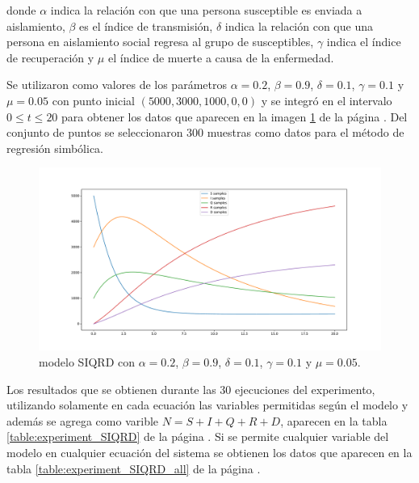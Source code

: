 donde $\alpha$ indica la relación con que una persona susceptible es enviada a aislamiento, $\beta$ es el índice de transmisión, $\delta$ indica la relación con que una persona en aislamiento social regresa al grupo de susceptibles, $\gamma$ indica el índice de recuperación y $\mu$ el índice de muerte a causa de la enfermedad.

Se utilizaron como valores de los parámetros $\alpha = 0.2$, $\beta = 0.9$, $\delta = 0.1$, $\gamma = 0.1$ y $\mu = 0.05$ con punto inicial $(5000, 3000, 1000, 0, 0)$ y se integró en el intervalo $0 \leq t \leq 20$ para obtener los datos que aparecen en la imagen \ref{fig:SIQRD} de la página \pageref{fig:SIQRD}. Del conjunto de puntos se seleccionaron 300 muestras como datos para el método de regresión simbólica.

\begin{figure}[h]
    \centering
    \includegraphics[width=\textwidth]{"figures/SIQRD.pdf"}
    \caption{modelo SIQRD con $\alpha = 0.2$, $\beta = 0.9$, $\delta = 0.1$, $\gamma = 0.1$ y $\mu = 0.05$.}
    \label{fig:SIQRD}
\end{figure}

Los resultados que se obtienen durante las 30 ejecuciones del experimento, utilizando solamente en cada ecuación las variables permitidas según el modelo y además se agrega como varible $N=S + I + Q + R + D$, aparecen en la tabla \ref{table:experiment_SIQRD} de la página \pageref{table:experiment_SIQRD}. Si se permite cualquier variable del modelo en cualquier ecuación del sistema se obtienen los datos que aparecen en la tabla \ref{table:experiment_SIQRD_all} de la página \pageref{table:experiment_SIQRD_all}.

